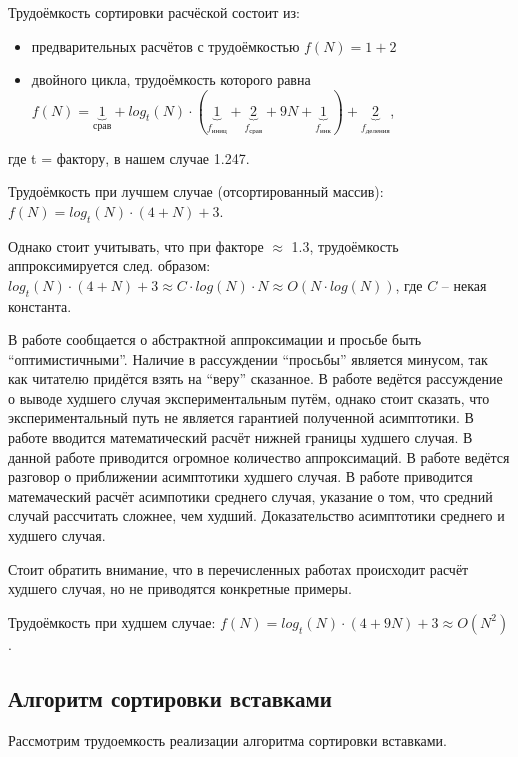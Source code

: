 Трудоёмкость сортировки расчёской состоит из:
\begin{itemize}
	\item предварительных расчётов с трудоёмкостью $f(N) = 1 + 2$
	\item двойного цикла, трудоёмкость которого равна 
	$f(N) = \underbrace{1}_{\text{срав}} + log_t(N) 
	\cdot 
	(\underbrace{1}_{f_\text{иниц}} + \underbrace{2}_{f_\text{срав}} + 9N + \underbrace{1}_{f_\text{инк}}) 
	+ \underbrace{2}_{f_\text{деления}}$,
\end{itemize}
где t = фактору, в нашем случае 1.247. 

Трудоёмкость при лучшем случае (отсортированный массив): 
$f(N) = log_t(N) \cdot (4 + N) + 3$.

Однако стоит учитывать, что при факторе $\approx$ 1.3, трудоёмкость 
аппроксимируется след. образом: 
$log_t(N) \cdot (4 + N) + 3 \approx C \cdot log(N) \cdot 
N \approx O(N \cdot log(N))$, где $C$ -- некая константа. 

В работе \cite{byte_ocr} сообщается о абстрактной аппроксимации и просьбе быть ``оптимистичными''. 
Наличие в рассуждении ``просьбы'' является минусом, так как читателю придётся взять на ``веру'' сказанное.
В работе \cite{comb_cocktail_counting_sort_compare} ведётся рассуждение о выводе худшего случая экспериментальным
путём, однако стоит сказать, что экспериментальный путь не является гарантией полученной асимптотики.
В работе \cite{kolmogorov_complexity} вводится математический расчёт нижней границы худшего случая. В данной 
работе приводится огромное количество аппроксимаций.
В работе \cite{simd} ведётся разговор о приближении асимптотики худшего случая.
В работе \cite{dobosiewicz_shaker_sort} приводится матемаческий расчёт асимпотики среднего случая, 
указание о том, что средний случай рассчитать сложнее, чем худший.
Доказательство асимптотики среднего и худшего случая.

Стоит обратить внимание, что в перечисленных работах происходит расчёт худшего случая, но не 
приводятся конкретные примеры.

Трудоёмкость при худшем случае: $f(N) =log_t(N) \cdot (4 + 9N) + 3 \approx O(N^2)$.

\subsection{Алгоритм сортировки вставками}

Рассмотрим трудоемкость реализации алгоритма сортировки вставками.

